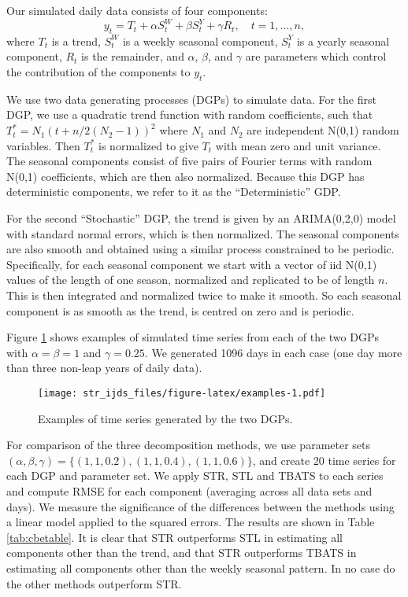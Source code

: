 \documentclass[11pt,a4paper,]{article}
\begin{document}
Our simulated daily data consists of four components:
\begin{equation}
  \label{STR:many_parts2}
  y_{t} = T_{t} + \alpha S^{W}_{t} + \beta S^{Y}_{t} + \gamma R_{t} , \quad t=1,\dots,n,
\end{equation}
where \(T_{t}\) is a trend, \(S^{W}_{t}\) is a weekly seasonal component, \(S^{Y}_{t}\) is a yearly seasonal component, \(R_{t}\) is the remainder, and \(\alpha\), \(\beta\), and \(\gamma\) are parameters which control the contribution of the components to \(y_{t}\).

We use two data generating processes (DGPs) to simulate data. For the first DGP, we use a quadratic trend function with random coefficients, such that \(T_t^* = N_1(t + n/2(N_2-1))^2\) where \(N_1\) and \(N_2\) are independent N(0,1) random variables. Then \(T_t^*\) is normalized to give \(T_t\) with mean zero and unit variance. The seasonal components consist of five pairs of Fourier terms with random N(0,1) coefficients, which are then also normalized. Because this DGP has deterministic components, we refer to it as the ``Deterministic'' GDP.

For the second ``Stochastic'' DGP, the trend is given by an ARIMA(0,2,0) model with standard normal errors, which is then normalized. The seasonal components are also smooth and obtained using a similar process constrained to be periodic. Specifically, for each seasonal component we start with a vector of iid N(0,1) values of the length of one season, normalized and replicated to be of length \(n\). This is then integrated and normalized twice to make it smooth. So each seasonal component is as smooth as the trend, is centred on zero and is periodic.

Figure \ref{fig:examples} shows examples of simulated time series from each of the two DGPs with \(\alpha=\beta=1\) and \(\gamma=0.25\). We generated 1096 days in each case (one day more than three non-leap years of daily data).

\begin{figure}
\centering
\texttt{[image: str\_ijds\_files/figure-latex/examples-1.pdf]}
\caption{\label{fig:examples}Examples of time series generated by the two DGPs.}
\end{figure}

For comparison of the three decomposition methods, we use parameter sets \((\alpha, \beta, \gamma) = \{(1, 1, 0.2), (1, 1, 0.4), (1, 1, 0.6)\}\), and create 20 time series for each DGP and parameter set. We apply STR, STL and TBATS to each series and compute RMSE for each component (averaging across all data sets and days). We measure the significance of the differences between the methods using a linear model applied to the squared errors. The results are shown in Table \ref{tab:cbetable}. It is clear that STR outperforms STL in estimating all components other than the trend, and that STR outperforms TBATS in estimating all components other than the weekly seasonal pattern. In no case do the other methods outperform STR.
\end{document}
